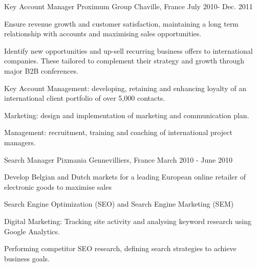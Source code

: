 \documentclass[11pt, a4paper]{awesome-cv}
\begin{document}
\begin{cventries}
	\cventry
	{Key Account Manager}
	{Proximum Group}
	{Chaville, France}
	{July 2010- Dec. 2011}
	{
		\begin{cvitems}
			\item Ensure revenue growth and customer satisfaction, maintaining a long term relationship with accounts and maximising sales opportunities.
			\item Identify new opportunities and up-sell recurring business offers to international companies. These tailored to complement their strategy and growth through major B2B conferences.
			\vspace{0.5em}
			\item Key Account Management: developing, retaining and enhancing loyalty of an international client portfolio of over 5,000 contacts.
			\item 	Marketing: design and implementation of marketing and communication plan.
			\item Management: recruitment, training and coaching of international project managers.			
		\end{cvitems} 
	}
	\cventry
	{Search Manager}
	{Pixmania}
	{Gennevilliers, France}
	{March 2010 - June 2010}
	{
		\begin{cvitems}
			\item Develop Belgian and Dutch markets for a leading European online retailer of electronic goods to maximise sales
			\vspace{0.5em}
			\item Search Engine Optimization (SEO) and Search Engine Marketing (SEM)
			\item Digital Marketing: Tracking site activity and analysing keyword research using Google Analytics. \item Performing competitor SEO research, defining search strategies to achieve business goals.					
		\end{cvitems} 
	}
\end{cventries}
\end{document}
